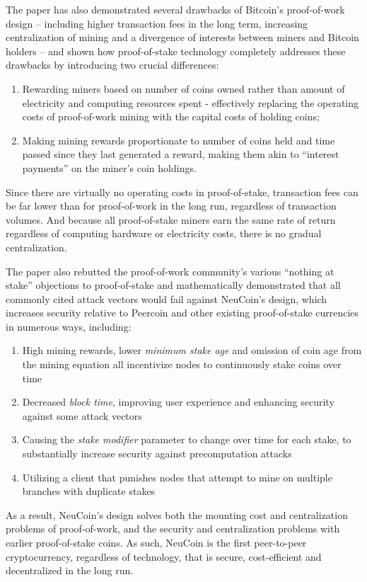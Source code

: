 \documentclass[a4paper,11pt]{article}
\begin{document}
The paper has also demonstrated several drawbacks of Bitcoin's proof-of-work design – including higher transaction fees in the long term, increasing centralization of mining and a divergence of interests between miners and Bitcoin holders – and shown how proof-of-stake technology completely addresses these drawbacks by introducing two crucial differences:
\begin{enumerate}
\setlength{\itemsep}{0pt}
\item{Rewarding miners based on number of coins owned rather than amount of electricity and computing resources spent - effectively replacing the operating costs of proof-of-work mining with the capital costs of holding coins;}
\item{Making mining rewards proportionate to number of coins held and time passed since they last generated a reward, making them akin to “interest payments” on the miner's coin holdings.}
\end{enumerate}   
Since there are virtually no operating costs in proof-of-stake, transaction fees can be far lower than for proof-of-work in the long run, regardless of transaction volumes. And because all proof-of-stake miners earn the same rate of return regardless of computing hardware or electricity costs, there is no gradual centralization. 
 
The paper also rebutted the proof-of-work community's various ``nothing at stake'' objections to proof-of-stake and mathematically demonstrated that all commonly cited attack vectors would fail against NeuCoin's design, which increases security relative to Peercoin and other existing proof-of-stake currencies in numerous ways, including:

\begin{enumerate}
\setlength{\itemsep}{0pt}
\item{High mining rewards, lower \textit{minimum stake age} and omission of coin age from the mining equation all incentivize nodes to continuously stake coins over time}
\item{Decreased \textit{\textit{block time}}, improving user experience and enhancing security against some attack vectors}
\item{Causing the \textit{stake modifier} parameter to change over time for each stake, to substantially increase security against precomputation attacks}
\item{Utilizing a client that punishes nodes that attempt to mine on multiple branches with duplicate stakes}
\end{enumerate}
 
As a result, NeuCoin's design solves both the mounting cost and centralization problems of proof-of-work, and the security and centralization problems with earlier proof-of-stake coins. As such, NeuCoin is the first peer-to-peer cryptocurrency, regardless of technology, that is secure, cost-efficient and decentralized in the long run.


\newpage



\end{document}
